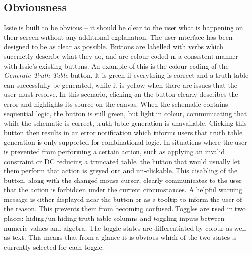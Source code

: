 \subsection{Obviousness}
Issie is built to be obvious -- it should be clear to the user what is happening on their screen without any additional explanation. The user interface has been designed to be as clear as possible.
Buttons are labelled with verbs which succinctly describe what they do, and are colour coded in a consistent manner with Issie's existing buttons. An example of this is the colour coding of the \textit{Generate Truth Table} button. It is green if everything is correct and a truth table can successfully be generated, while it is yellow when there are issues that the user must resolve. In this scenario, clicking on the button clearly describes the error and highlights its source on the canvas. When the schematic contains sequential logic, the button is still green, but light in colour, communicating that while the schematic is correct, truth table generation is unavailable. Clicking this button then results in an error notification which informs users that truth table generation is only supported for combinational logic. In situations where the user is prevented from performing a certain action, such as applying an invalid constraint or DC reducing a truncated table, the button that would usually let them perform that action is greyed out and un-clickable. This disabling of the button, along with the changed mouse cursor, clearly communicates to the user that the action is forbidden under the current circumstances. A helpful warning message is either displayed near the button or as a tooltip to inform the user of the reason. This prevents them from becoming confused.
Toggles are used in two places: hiding/un-hiding truth table columns and toggling inputs between numeric values and algebra. The toggle states are differentiated by colour as well as text. This means that from a glance it is obvious which of the two states is currently selected for each toggle. 

